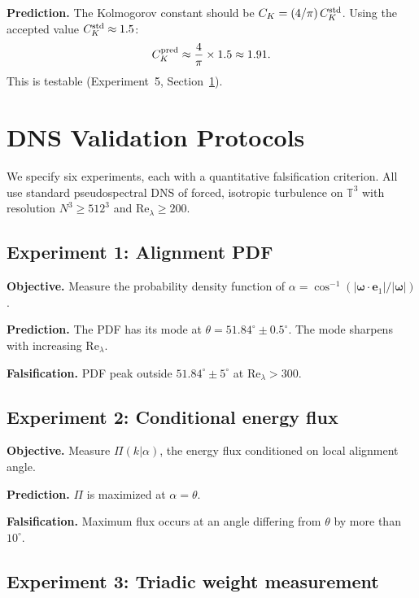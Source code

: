 \documentclass[12pt,a4paper]{article}
\begin{document}
\noindent\textbf{Prediction.}
The Kolmogorov constant should be $C_K = (4/\pi)\,C_K^{\rm std}$.
Using the accepted value $C_K^{\rm std} \approx 1.5$:
\begin{equation}
C_K^{\rm pred} \approx \frac{4}{\pi}\times 1.5 \approx 1.91.
\end{equation}
This is testable (Experiment~5, Section~\ref{sec:dns}).

\section{DNS Validation Protocols}
\label{sec:dns}

We specify six experiments, each with a quantitative falsification criterion.
All use standard pseudospectral DNS of forced, isotropic turbulence on $\mathbb{T}^3$ with resolution $N^3 \geq 512^3$ and $\mathrm{Re}_\lambda \geq 200$.

\subsection{Experiment 1: Alignment PDF}

\noindent\textbf{Objective.}
Measure the probability density function of $\alpha = \cos^{-1}(|\bm{\omega}\cdot\bm{e}_1|/|\bm{\omega}|)$.

\noindent\textbf{Prediction.}
The PDF has its mode at $\theta = 51.84^\circ \pm 0.5^\circ$.
The mode sharpens with increasing $\mathrm{Re}_\lambda$.

\noindent\textbf{Falsification.}
PDF peak outside $51.84^\circ \pm 5^\circ$ at $\mathrm{Re}_\lambda > 300$.

\subsection{Experiment 2: Conditional energy flux}

\noindent\textbf{Objective.}
Measure $\Pi(k|\alpha)$, the energy flux conditioned on local alignment angle.

\noindent\textbf{Prediction.}
$\Pi$ is maximized at $\alpha = \theta$.

\noindent\textbf{Falsification.}
Maximum flux occurs at an angle differing from $\theta$ by more than $10^\circ$.

\subsection{Experiment 3: Triadic weight measurement}
\end{document}

